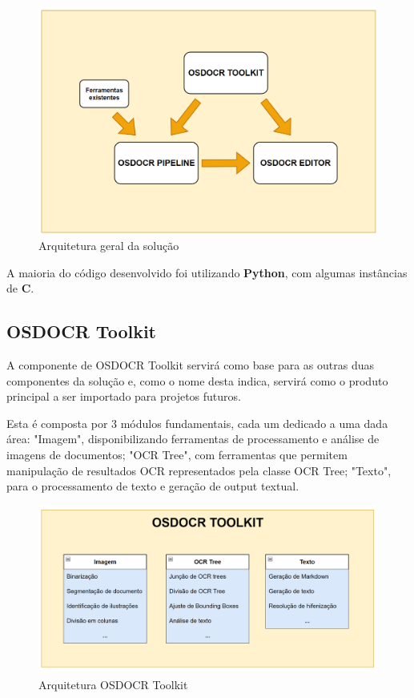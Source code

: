 \begin{figure}[H]
	\centering
	\includegraphics[width=1\textwidth]{images/diagramas/arquitetura_geral.png}
	\caption{Arquitetura geral da solução}
	\label{fig:arquitetura_geral}
\end{figure}

A maioria do código desenvolvido foi utilizando \textbf{Python}, com algumas instâncias de \textbf{C}.

\subsection{OSDOCR Toolkit}


A componente de OSDOCR Toolkit servirá como base para as outras duas componentes da solução e, como o nome desta indica, servirá como o produto principal a ser importado para projetos futuros.

Esta é composta por 3 módulos fundamentais, cada um dedicado a uma dada área: "Imagem", disponibilizando ferramentas de processamento e análise de imagens de documentos; "OCR Tree", com ferramentas que permitem manipulação de resultados OCR representados pela classe OCR Tree; "Texto", para o processamento de texto e geração de output textual.

\begin{figure}[H]
	\centering
	\includegraphics[width=1\textwidth]{images/diagramas/arquitetura_toolkit.png}
	\caption{Arquitetura OSDOCR Toolkit}
	\label{fig:arquitetura_toolkit}
\end{figure}


